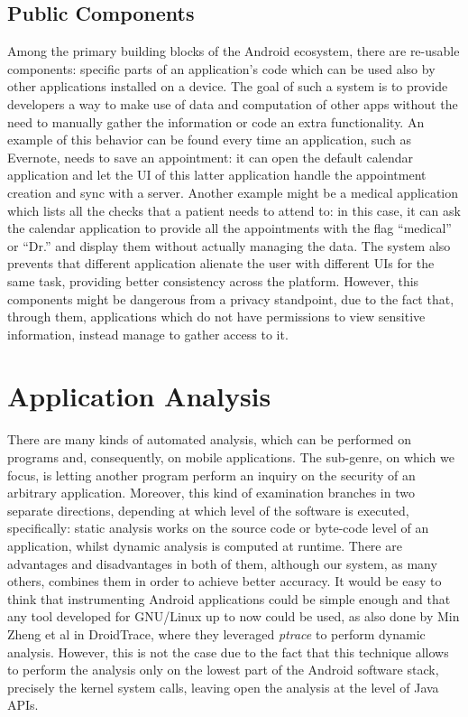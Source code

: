 \subsection{Public Components}
\label{sc:exportedcomponents}
Among the primary building blocks of the Android ecosystem, there are re-usable components: specific parts of an application's code which can be used also by other applications installed on a device. The goal of such a system is to provide developers a way to make use of  data and computation of other apps without the need to manually gather the information or code an extra functionality. An example of this behavior can be found every time an application, such as Evernote, needs to save an appointment: it can open the default calendar application and let the UI of this latter application handle the appointment creation and sync with a server. Another example might be a medical application which lists all the checks that a patient needs to attend to: in this case, it can ask the calendar application to provide all the appointments with the flag \enquote{medical} or \enquote{Dr.} and display them without actually managing the data. The system also prevents that different application alienate the user with different UIs for the same task, providing better consistency across the platform. However, this components might be dangerous from a privacy standpoint, due to the fact that, through them, applications which do not have permissions to view sensitive information, instead manage to gather access to it.


\section{Application Analysis}
There are many kinds of automated analysis, which can be performed on programs and, consequently, on mobile applications. The sub-genre, on which we focus, is letting another program perform an inquiry on the security of an arbitrary application. Moreover, this kind of examination branches in two separate directions, depending at which level of the software is executed, specifically: static analysis works on the source code or byte-code level of an application, whilst dynamic analysis is computed at runtime. There are advantages and disadvantages in both of them, although our system, as many others, combines them in order to achieve better accuracy.
It would be easy to think that instrumenting Android applications could be simple enough and that any tool developed for GNU/Linux up to now could be used, as also done by Min Zheng et al in DroidTrace\cite{droidtrace}, where they leveraged \emph{ptrace} to perform dynamic analysis. However, this is not the case due to the fact that this technique allows to perform the analysis only on the lowest part of the Android software stack, precisely the kernel system calls, leaving open the analysis at the level of Java APIs. 

